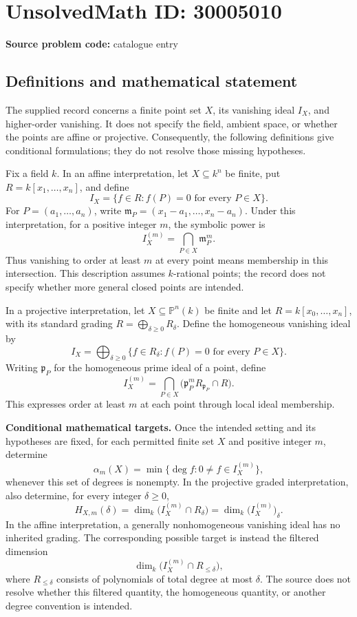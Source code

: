 \documentclass[11pt]{article}
\newcommand{\PP}{\mathbb{P}}
\begin{document}
\section*{UnsolvedMath ID: 30005010}
\textbf{Source problem code:} catalogue entry
\subsection{Definitions and mathematical statement}
The supplied record concerns a finite point set \(X\), its vanishing ideal \(I_X\), and higher-order vanishing. It does not specify the field, ambient space, or whether the points are affine or projective. Consequently, the following definitions give conditional formulations; they do not resolve those missing hypotheses.

Fix a field \(k\). In an affine interpretation, let \(X\subseteq k^n\) be finite, put \(R=k[x_1,\ldots,x_n]\), and define
\[
I_X=\{f\in R:f(P)=0\text{ for every }P\in X\}.
\]
For \(P=(a_1,\ldots,a_n)\), write \(\mathfrak m_P=(x_1-a_1,\ldots,x_n-a_n)\). Under this interpretation, for a positive integer \(m\), the symbolic power is
\[
I_X^{(m)}=\bigcap_{P\in X}\mathfrak m_P^m.
\]
Thus vanishing to order at least \(m\) at every point means membership in this intersection. This description assumes \(k\)-rational points; the record does not specify whether more general closed points are intended.

In a projective interpretation, let \(X\subseteq\PP^n(k)\) be finite and let \(R=k[x_0,\ldots,x_n]\), with its standard grading \(R=\bigoplus_{\delta\geq0}R_\delta\). Define the homogeneous vanishing ideal by
\[
I_X=\bigoplus_{\delta\geq0}\{f\in R_\delta:f(P)=0\text{ for every }P\in X\}.
\]
Writing \(\mathfrak p_P\) for the homogeneous prime ideal of a point, define
\[
I_X^{(m)}=\bigcap_{P\in X}\bigl(\mathfrak p_P^mR_{\mathfrak p_P}\cap R\bigr).
\]
This expresses order at least \(m\) at each point through local ideal membership.

\textbf{Conditional mathematical targets.} Once the intended setting and its hypotheses are fixed, for each permitted finite set \(X\) and positive integer \(m\), determine
\[
\alpha_m(X)=\min\{\deg f:0\ne f\in I_X^{(m)}\},
\]
whenever this set of degrees is nonempty. In the projective graded interpretation, also determine, for every integer \(\delta\geq0\),
\[
H_{X,m}(\delta)=\dim_k\bigl(I_X^{(m)}\cap R_\delta\bigr)
=\dim_k\bigl(I_X^{(m)}\bigr)_\delta.
\]
In the affine interpretation, a generally nonhomogeneous vanishing ideal has no inherited grading. The corresponding possible target is instead the filtered dimension
\[
\dim_k\bigl(I_X^{(m)}\cap R_{\leq\delta}\bigr),
\]
where \(R_{\leq\delta}\) consists of polynomials of total degree at most \(\delta\). The source does not resolve whether this filtered quantity, the homogeneous quantity, or another degree convention is intended.
\end{document}
